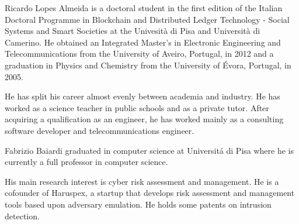 \documentclass{ieeeaccess}
\begin{document}
\twocolumn




\begin{IEEEbiography}{Ricardo Lopes Almeida} is a doctoral student in the first edition of the Italian Doctoral Programme in Blockchain and Distributed Ledger Technology - Social Systems and Smart Societies at the Univesità di Pisa and Università di Camerino. He obtained an Integrated Master's in Electronic Engineering and Telecommunications from the University of Aveiro, Portugal, in 2012 and a graduation in Physics and Chemistry from the University of \'Evora, Portugal, in 2005.
    \par
    He has split his career almost evenly between academia and industry. He has worked as a science teacher in public schools and as a private tutor. After acquiring a qualification as an engineer, he has worked mainly as a consulting software developer and telecommunications engineer.
\end{IEEEbiography}

\begin{IEEEbiography}{Fabrizio Baiardi} graduated in computer science at Universit\'a di Pisa where he is currently a full professor in computer science.
    \par
    His main research interest is cyber risk assessment and management. He is a cofounder of Haruspex, a startup that develops risk assessment and management tools based upon adversary emulation. He holds some patents on intrusion detection.
\end{IEEEbiography}
\end{document}
